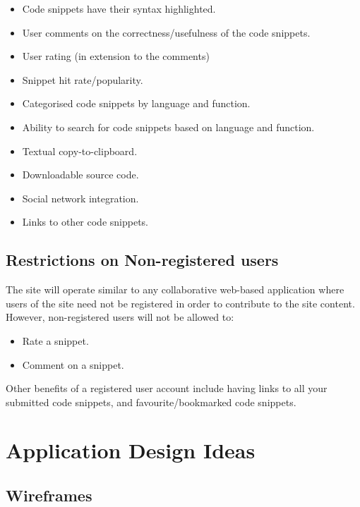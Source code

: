 \documentclass[11pt,a4paper]{article}
\begin{document}
\begin{itemize}
\item Code snippets have their syntax highlighted.
\item User comments on the correctness/usefulness of the code snippets.
\item User rating (in extension to the comments)
\item Snippet hit rate/popularity.
\item Categorised code snippets by language and function.
\item Ability to search for code snippets based on language and function.
\item Textual copy-to-clipboard.
\item Downloadable source code.
\item Social network integration.
\item Links to other code snippets.
\end{itemize}

\subsection{Restrictions on Non-registered users}
\label{sec:restrict}

The site will operate similar to any collaborative web-based application
where users of the site need not be registered in order to contribute
to the site content. However, non-registered users will not be allowed to:

\begin{itemize}
\item Rate a snippet.
\item Comment on a snippet.
\end{itemize}
Other benefits of a registered user account include having links to all
your submitted code snippets, and favourite/bookmarked code snippets.

\newpage

\section{Application Design Ideas}

\subsection{Wireframes}
\end{document}
